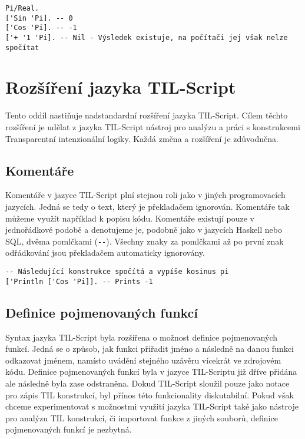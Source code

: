 \begin{lstlisting}[caption={Příklad využití symbolických hodnot}]
Pi/Real.
['Sin 'Pi]. -- 0
['Cos 'Pi]. -- -1
['+ '1 'Pi]. -- Nil - Výsledek existuje, na počítači jej však nelze spočítat
\end{lstlisting}

\section{Rozšíření jazyka TIL-Script}

Tento oddíl nastiňuje nadstandardní rozšíření jazyka TIL-Script. Cílem těchto rozšíření je udělat
z jazyka TIL-Script nástroj pro analýzu a práci s konstrukcemi Transparentní intenzionální logiky.
Každá změna a rozšíření je zdůvodněna.

\subsection{Komentáře}

Komentáře v jazyce TIL-Script plní stejnou roli jako v jiných programovacích jazycích. Jedná se tedy
o text, který je překladačem ignorován. Komentáře tak můžeme využít například k popisu kódu.
Komentáře existují pouze v jednořádkové podobě a denotujeme je, podobně jako v jazycích Haskell
nebo SQL, dvěma pomlčkami (\lstinline{--}). Všechny znaky za pomlčkami až po první znak odřádkování
jsou překladačem automaticky ignorovány.

\begin{lstlisting}[caption={Příklad využití komentářů}]
-- Následující konstrukce spočítá a vypíše kosinus pi
['Println ['Cos 'Pi]]. -- Prints -1
\end{lstlisting}

\subsection{Definice pojmenovaných funkcí}\label{fn-definition}

Syntax jazyka TIL-Script byla rozšířena o možnost definice pojmenovaných funkcí. Jedná se o způsob,
jak funkci přiřadit jméno a následně na danou funkci odkazovat jménem, namísto uvádění stejného
uzávěru vícekrát ve zdrojovém kódu. Definice pojmenovaných funkcí byla v jazyce TIL-Scriptu již
dříve přidána ale následně byla zase odstraněna. Dokud TIL-Script sloužil pouze jako notace pro
zápis TIL konstrukcí, byl přínos této funkcionality diskutabilní. Pokud však chceme experimentovat
s možnostmi využití jazyka TIL-Script také jako nástroje pro analýzu TIL konstrukcí, či importovat
funkce z jiných souborů, definice pojmenovaných funkcí je nezbytná.

